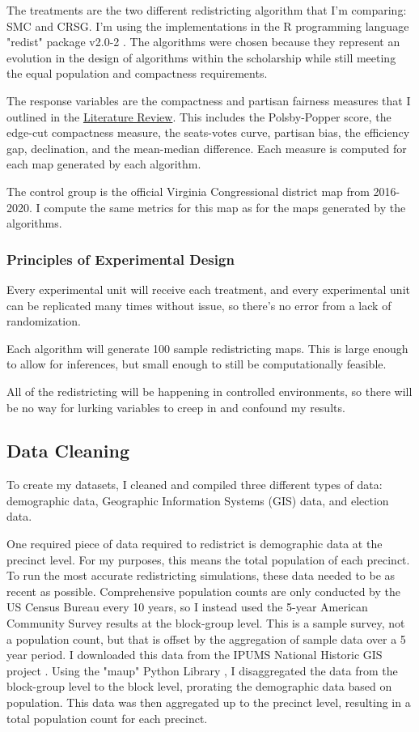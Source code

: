 The treatments  are the two different redistricting algorithm that I'm comparing: SMC and CRSG. I'm using the implementations in the R programming language "redist" package v2.0-2 \parencite{fifield2020d}. The algorithms were chosen because they represent an evolution in the design of algorithms within the scholarship while still meeting the equal population and compactness requirements.

The response variables are the compactness and partisan fairness measures that I outlined in the \hyperref[sec:litreview]{Literature Review}. This includes the Polsby-Popper score, the edge-cut compactness measure, the seats-votes curve, partisan bias, the efficiency gap, declination, and the mean-median difference. Each measure is computed for each map generated by each algorithm.

The control group is the official Virginia Congressional district map from 2016-2020. I compute the same metrics for this map as for the maps generated by the algorithms.

\subsubsection{Principles of Experimental Design}

Every experimental unit will receive each treatment, and every experimental unit can be replicated many times without issue, so there's no error from a lack of randomization. 

Each algorithm will generate 100 sample redistricting maps. This is large enough to allow for inferences, but small enough to still be computationally feasible. 

All of the redistricting will be happening in controlled environments, so there will be no way for lurking variables to creep in and confound my results. 

\subsection{Data Cleaning}

To create my datasets, I cleaned and compiled three different types of data: demographic data, Geographic Information Systems (GIS) data, and election data.

One required piece of data required to redistrict is demographic data at the precinct level. For my purposes, this means the total population of each precinct. To run the most accurate redistricting simulations, these data needed to be as recent as possible. Comprehensive population counts are only conducted by the US Census Bureau every 10 years, so I instead used the 5-year American Community Survey results at the block-group level. This is a sample survey, not a population count, but that is offset by the aggregation of sample data over a 5 year period. I downloaded this data from the IPUMS National Historic GIS project \parencite{mansonsteven2020}. Using the "maup" Python Library \parencite{hully2020}, I disaggregated the data from the block-group level to the block level, prorating the demographic data based on population. This data was then aggregated up to the precinct level, resulting in a total population count for each precinct.


